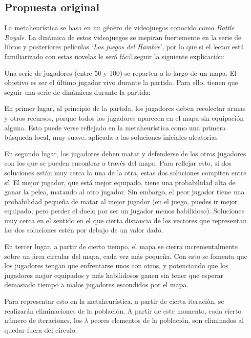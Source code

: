 \documentclass[11pt]{article}
\begin{document}
\subsection{Propuesta original}

La metaheurística se basa en un género de videojuegos conocido como \emph{Battle Royale}. La dinámica de estos videojuegos se inspiran fuertemente en la serie de libros y posteriores películas `\emph{Los juegos del Hambre}', por lo que si el lector está familiarizado con estas novelas le será fácil seguir la siguiente explicación:

Una serie de jugadores (entre 50 y 100) se reparten a lo largo de un mapa. El objetivo es ser el último jugador vivo durante la partida. Para ello, tienen que seguir una serie de dinámicas durante la partida:

En primer lugar, al principio de la partida, los jugadores deben recolectar armas y otros recursos, porque todos los jugadores aparecen en el mapa sin equipación alguna. Esto puede verse reflejado en la metaheurística como una primera búsqueda local, muy suave, aplicada a las soluciones iniciales aleatorias

En segundo lugar, los jugadores deben matar y defenderse de los otros jugadores con los que se pueden encontrar a través del mapa. Para reflejar esto, si dos soluciones están muy cerca la una de la otra, estas dos soluciones compiten entre sí. El mejor jugador, que está mejor equipado, tiene una probabilidad alta de ganar la pelea, matando al otro jugador. Sin embargo, el peor jugador tiene una probabilidad pequeña de matar al mejor jugador (en el juego, puedes ir mejor equipado, pero perder el duelo por ser un jugador menos habilidoso). Soluciones muy cerca en el sentido en el que cierta distancia de los vectores que representan las dos soluciones estén por debajo de un valor dado.

En tercer lugar, a partir de cierto tiempo, el mapa se cierra incrementalmente sobre un área circular del mapa, cada vez más pequeña. Con esto se fomenta que los jugadores tengan que enfrentarse unos con otros, y potenciando que los jugadores mejor equipados y más habilidosos ganen sin tener que esperar demasiado tiempo a malos jugadores escondidos por el mapa.

Para representar esto en la metaheurística, a partir de cierta iteración, se realizarán eliminaciones de la población. A partir de este momento, cada cierto número de iteraciones, los $\lambda$ peores elementos de la población, son eliminados al quedar fuera del círculo.
\end{document}
